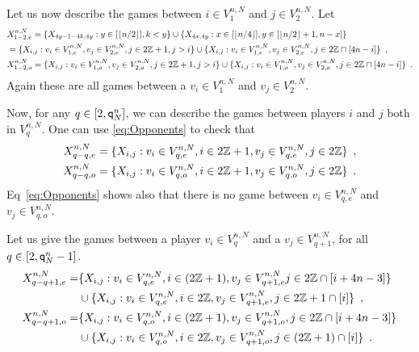 Let us now describe the games between $i\in V_{1}^{n,N}$ and $j\in V_{2}^{n,N}$. Let 
\begin{align*}
&X_{1-2,e}^{n,N}=\{X_{4y-1-4k,4y} : y\in [\left\lfloor n/2\right\rfloor], k<y\}\cup\{X_{4x,4y} : x\in[\left\lfloor n/4\right\rfloor], y\in[\left\lfloor n/2\right\rfloor+1,n-x]\}\\
&=\{X_{i,j} : v_i\in V_{1,e}^{n,N},v_j\in V_{2,e}^{n,N},j\in 2\mathbb{Z}+1,j>i\}\cup\{X_{i,j} : v_i\in V_{1,e}^{n,N},v_j\in V_{2,e}^{n,N},j\in 2\mathbb{Z}\cap [4n-i]\}\enspace,\\
&X_{1-2,o}^{n,N}=\{X_{i,j} : v_i\in V_{1,o}^{n,N},v_j\in V_{2,o}^{n,N},j\in 2\mathbb{Z}+1,j>i\}\cup\{X_{i,j} : v_i\in V_{1,o}^{n,N},v_j\in V_{2,o}^{n,N},j\in 2\mathbb{Z}\cap [4n-i]\}\enspace.
\end{align*}
Again these are all games between a $v_i\in V_{1}^{n,N}$ and $v_j\in V_{2}^{n,N}$.

Now, for any $q\in [2,{\mathsf{q}}^{n}_{N}]$, we can describe the games between players $i$ and $j$ both in $V_{q}^{n,N}$. One can use \eqref{eq:Opponents} to check that
\begin{align}
 \notag X_{q- q,e}^{n,N}&=\{X_{i,j} : v_i\in V_{q,e}^{n,N},i\in 2\mathbb{Z}+1, v_j\in V_{q,e}^{n,N},j\in 2\mathbb{Z}\}\enspace,\\
\label{Def:Vqtoq}  X_{q- q,o}^{n,N}&=\{X_{i,j} : v_i\in V_{q,o}^{n,N},i\in 2\mathbb{Z}+1, v_j\in V_{q,o}^{n,N},j\in 2\mathbb{Z}\}\enspace.
\end{align}
Eq~\eqref{eq:Opponents} shows also that there is no game between $v_i\in V_{q,e}^{n,N}$ and $v_j\in V_{q,o}^{n,N}$. 

Let us give the games between a player $v_i\in V_{q}^{n,N}$ and a $v_j\in V_{q+1}^{n,N}$, for all $q\in[2,{\mathsf{q}}^{n}_{N}-1]$.
\begin{align*}
X_{q- q+1,e}^{n,N}=&\{X_{i,j} : v_i\in V_{q,e}^{n,N},i\in(2\mathbb{Z}+1),v_j\in V_{q+1,e}^{n,N}j\in 2\mathbb{Z}\cap [i+4n-3]\}\\
&\cup\{X_{i,j} : v_i\in V_{q,e}^{n,N},i\in 2\mathbb{Z},v_j\in V_{q+1,e}^{n,N},j\in 2\mathbb{Z}+1\cap [i]\}\enspace,\\
X_{q- q+1,o}^{n,N}=&\{X_{i,j} : v_i\in V_{q,o}^{n,N},i\in(2\mathbb{Z}+1),v_j\in V_{q+1,o}^{n,N},j\in2\mathbb{Z}\cap [i+4n-3]\}\\
&\cup\{X_{i,j} : v_i\in V_{q,o}^{n,N},i\in2\mathbb{Z},v_j\in V_{q+1,o}^{n,N},j\in( 2\mathbb{Z}+1)\cap [i]\}\enspace.
\end{align*}


